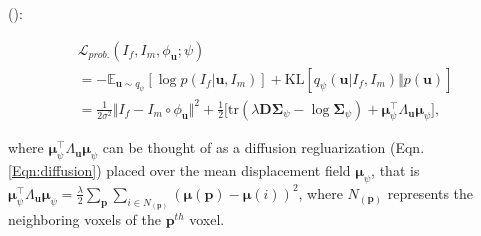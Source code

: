 \documentclass[times,twocolumn,final]{elsarticle}
\begin{document}
(\cite{dalca2019unsupervised}):
\begin{linenomath}
\begin{equation}
\label{eqn:L_prob_append}
    \begin{split}
        &\mathcal{L}_{prob.}(I_f, I_m, \phi_\mathbf{u}; \psi)\\&=-\mathbb{E}_{\mathbf{u}\sim q_{\psi}}\left[\log p(I_f|\mathbf{u}, I_m)\right]+\text{KL}\left[q_\psi(\mathbf{u}|I_f, I_m)\Vert p(\mathbf{u})\right]\\
        &=\frac{1}{2\sigma^2}\Vert I_f-I_m\circ\phi_\mathbf{u}\Vert^2+\frac{1}{2}\Bigg[\text{tr}(\lambda\mathbf{D}\mathbf{\Sigma}_\psi-\log \mathbf{\Sigma}_\psi)+\mathbf{\mu}^\top_\psi\Lambda_\mathbf{u}\mathbf{\mu}_\psi\Bigg],
    \end{split}
\end{equation}
\end{linenomath}
where $\mathbf{\mu}^\top_\psi\Lambda_{\mathbf{u}}\mathbf{\mu}_\psi$ can be thought of as a diffusion regluarization (Eqn. \ref{Eqn:diffusion}) placed over the mean displacement field $\mathbf{\mu}_\psi$, that is  $\mathbf{\mu}^\top_\psi\Lambda_\mathbf{u}\mathbf{\mu}_\psi=\frac{\lambda}{2}\sum_\mathbf{p}\sum_{i\in N_{(\mathbf{p})}}(\mathbf{\mu}(\mathbf{p})-\mathbf{\mu}(i))^2$, where $N_{(\mathbf{p})}$ represents the neighboring voxels of the $\mathbf{p}^{th}$ voxel. 
\end{document}
